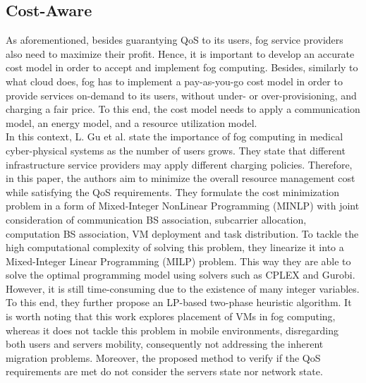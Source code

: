 \subsection{Cost-Aware}\label{sec:cost}
As aforementioned, besides guarantying QoS to its users, fog service providers also need to maximize their profit. Hence, it is important to develop an accurate cost model in order to accept and implement fog computing. Besides, similarly to what cloud does, fog has to implement a pay-as-you-go cost model in order to provide services on-demand to its users, without under- or over-provisioning, and charging a fair price. To this end, the cost model needs to apply a communication model, an energy model, and a resource utilization model.\\
\noindent\tab In this context, L. Gu et al. \cite{gu2017cost} state the importance of fog computing in medical cyber-physical systems as the number of users grows. They state that different infrastructure service providers may apply different charging policies. Therefore, in this paper, the authors aim to minimize the overall resource management cost while satisfying the QoS requirements. They formulate the cost minimization problem in a form of Mixed-Integer NonLinear Programming (MINLP) with joint consideration of communication BS association, subcarrier allocation, computation BS association, VM deployment and task distribution. To tackle the high computational complexity of solving this problem, they linearize it into a Mixed-Integer Linear Programming (MILP) problem. This way they are able to solve the optimal programming model using solvers such as CPLEX and Gurobi. However, it is still time-consuming due to the existence of many integer variables. To this end, they further propose an LP-based two-phase heuristic algorithm. It is worth noting that this work explores placement of VMs in fog computing, whereas it does not tackle this problem in mobile environments, disregarding both users and servers mobility, consequently not addressing the inherent migration problems. Moreover, the proposed method to verify if the QoS requirements are met do not consider the servers state nor network state.\\
